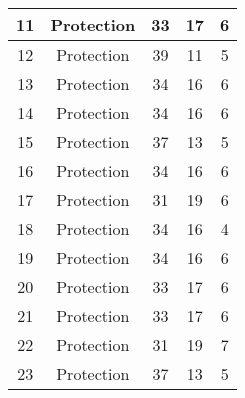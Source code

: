 \documentclass[results.tex]{subfiles}
\begin{document}
\begin{center}
\begin{tabular}{| c || c | c | c | c |}
            \hline
            11                      & Protection                   & 33                     & 17                      & 6                    \\
            \hline
            12                      & Protection                   & 39                     & 11                      & 5                    \\
            \hline
            13                      & Protection                   & 34                     & 16                      & 6                    \\
            \hline
            14                      & Protection                   & 34                     & 16                      & 6                    \\
            \hline
            15                      & Protection                   & 37                     & 13                      & 5                    \\
            \hline
            16                      & Protection                   & 34                     & 16                      & 6                    \\
            \hline
            17                      & Protection                   & 31                     & 19                      & 6                    \\
            \hline
            18                      & Protection                   & 34                     & 16                      & 4                    \\
            \hline
            19                      & Protection                   & 34                     & 16                      & 6                    \\
            \hline
            20                      & Protection                   & 33                     & 17                      & 6                    \\
            \hline
            21                      & Protection                   & 33                     & 17                      & 6                    \\
            \hline
            22                      & Protection                   & 31                     & 19                      & 7                    \\
            \hline
            23                      & Protection                   & 37                     & 13                      & 5                    \\

\end{tabular}
\end{center}
\end{document}
